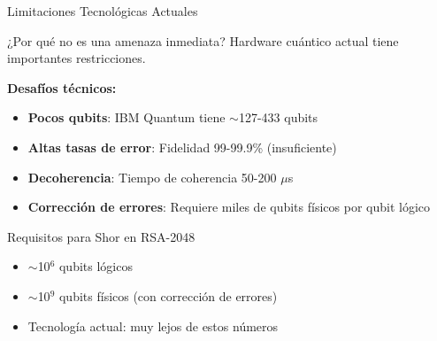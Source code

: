 \documentclass[aspectratio=169]{beamer}
\begin{document}

\begin{frame}{Limitaciones Tecnológicas Actuales}
\begin{block}{¿Por qué no es una amenaza inmediata?}
Hardware cuántico actual tiene importantes restricciones.
\end{block}

\vspace{0.3cm}
\textbf{Desafíos técnicos:}
\begin{itemize}
\item \textbf{Pocos qubits}: IBM Quantum tiene $\sim$127-433 qubits
\item \textbf{Altas tasas de error}: Fidelidad 99-99.9\% (insuficiente)
\item \textbf{Decoherencia}: Tiempo de coherencia 50-200 $\mu$s
\item \textbf{Corrección de errores}: Requiere miles de qubits físicos por qubit lógico
\end{itemize}

\vspace{0.3cm}
\begin{exampleblock}{Requisitos para Shor en RSA-2048}
\begin{itemize}
\item $\sim$10$^6$ qubits lógicos
\item $\sim$10$^9$ qubits físicos (con corrección de errores)
\item Tecnología actual: muy lejos de estos números
\end{itemize}
\end{exampleblock}
\end{frame}
\end{document}
